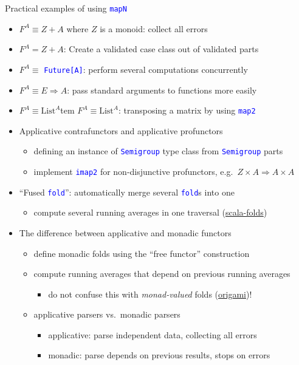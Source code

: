 \documentclass[english]{beamer}
\begin{document}
\begin{frame}{Practical examples of using \texttt{\textcolor{blue}{\footnotesize{}mapN}} }
\begin{itemize}
\item \vspace{-0.2cm}$F^{A}\equiv Z+A$ where $Z$ is a monoid: collect
all errors
\item $F^{A}=Z+A$: Create a validated case class out of validated parts
\item $F^{A}\equiv$ \texttt{\textcolor{blue}{\footnotesize{}Future{[}A{]}}}:
perform several computations concurrently
\item $F^{A}\equiv E\Rightarrow A$: pass standard arguments to functions
more easily
\item $F^{A}\equiv\text{List}^{A}$tem $F^{A}\equiv\text{List}^{A}$: transposing a matrix by using \texttt{\textcolor{blue}{\footnotesize{}map2}} 
\item Applicative contrafunctors and applicative profunctors
\begin{itemize}
\item defining an instance of \texttt{\textcolor{blue}{\footnotesize{}Semigroup}}
type class from \texttt{\textcolor{blue}{\footnotesize{}Semigroup}}
parts
\item implement \texttt{\textcolor{blue}{\footnotesize{}imap2}} for non-disjunctive
profunctors, e.g.\ $Z\times A\Rightarrow A\times A$
\end{itemize}
\item ``Fused \texttt{\textcolor{blue}{\footnotesize{}fold}}'': automatically
merge several \texttt{\textcolor{blue}{\footnotesize{}fold}}s into
one
\begin{itemize}
\item compute several running averages in one traversal (\href{https://github.com/amarpotghan/scala-fold}{scala-folds})
\end{itemize}
\item The difference between applicative and monadic functors
\begin{itemize}
\item define monadic folds using the ``free functor'' construction
\item compute running averages that depend on previous running averages
\begin{itemize}
\item do not confuse this with \emph{monad-valued} folds (\href{https://github.com/atnos-org/origami}{origami})!
\end{itemize}
\item applicative parsers vs.\ monadic parsers
\begin{itemize}
\item applicative: parse independent data, collecting all errors
\item monadic: parse depends on previous results, stops on errors
\end{itemize}
\end{itemize}
\end{itemize}
\end{frame}
\end{document}
